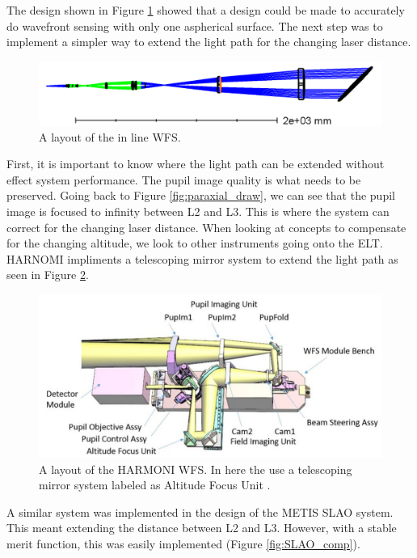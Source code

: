 The design shown in Figure \ref{fig:full_lens} showed that a design could be made to
accurately do wavefront sensing with only one aspherical surface.  The next step was
to implement a simpler way to extend the light path for the changing laser distance.

\begin{figure}[h!]
\centering
\includegraphics[width=14cm]{Figures/full_lens.png}
\caption{A layout of the in line WFS.}
\label{fig:full_lens}
\end{figure}


First, it is important to know where the light path can be extended without effect
system performance.  The pupil image quality is what needs to be preserved.  Going
back to Figure \ref{fig:paraxial_draw}, we can see that the pupil image is focused
to infinity between L2 and L3.  This is where the system can correct for the
changing laser distance.  When looking at concepts to compensate for the changing
altitude, we look to other instruments going onto the ELT.  HARNOMI impliments a
telescoping mirror system to extend the light path as seen in Figure
\ref{fig:harmoni}.

\begin{figure}[h!]
\centering
\includegraphics[width=14cm]{Figures/HARMONI_AO.jpg}
\caption{A layout of the HARMONI WFS.  In here the use a telescoping mirror system labeled as Altitude Focus Unit \cite{harmoni}.}
\label{fig:harmoni}
\end{figure}

A similar system was implemented in the design of the METIS SLAO system.  This meant
extending the distance between L2 and L3.  However, with a stable merit function,
this was easily implemented (Figure \ref{fig:SLAO_comp}).

